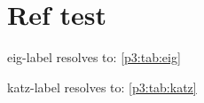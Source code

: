 \documentclass[11pt]{article}
\begin{document}

\section{Ref test}
eig-label resolves to: \ref{p3:tab:eig}\par
katz-label resolves to: \ref{p3:tab:katz}
\end{document}
